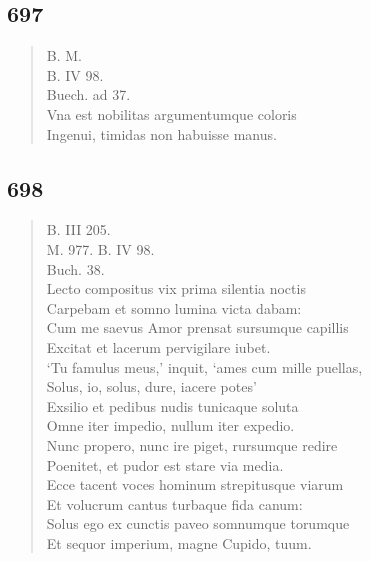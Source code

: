 \documentclass[11pt, a4paper]{report}
\begin{document}
            \subsection*{697}
      \begin{verse}
      B. M. \\ B. IV 98. \\ Buech. ad 37. \\ Vna est nobilitas argumentumque coloris \\ Ingenui, timidas non habuisse manus. \\ 
      \end{verse}
  
            \subsection*{698}
      \begin{verse}
      B. III 205. \\ M. 977. B. IV 98. \\ Buch. 38. \\ Lecto compositus vix prima silentia noctis \\ Carpebam et somno lumina victa dabam: \\ Cum me saevus Amor prensat sursumque capillis \\ Excitat et lacerum pervigilare iubet. \\ ‘Tu famulus meus,’ inquit, ‘ames cum mille puellas, \\ Solus, io, solus, dure, iacere potes’ \\ Exsilio et pedibus nudis tunicaque soluta \\ Omne iter impedio, nullum iter expedio. \\ Nunc propero, nunc ire piget, rursumque redire \\ Poenitet, et pudor est stare via media. \\ Ecce tacent voces hominum strepitusque viarum \\ Et volucrum cantus turbaque fida canum: \\ Solus ego ex cunctis paveo somnumque torumque \\ Et sequor imperium, magne Cupido, tuum. \\ 
      \end{verse}
  
\end{document}
